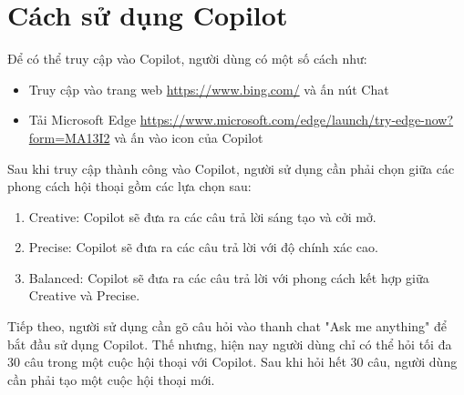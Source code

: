 \section{Cách sử dụng Copilot}
Để có thể truy cập vào Copilot\cite{link_5}, người dùng có một số cách như:
\begin{itemize}
    \item Truy cập vào trang web \url{https://www.bing.com/} và ấn nút Chat
    \item Tải Microsoft Edge \url{https://www.microsoft.com/edge/launch/try-edge-now?form=MA13I2} và ấn vào icon của Copilot
\end{itemize}
Sau khi truy cập thành công vào Copilot, người sử dụng cần phải chọn giữa các phong cách hội thoại gồm các lựa chọn sau:
\begin{enumerate}
    \item Creative: Copilot sẽ đưa ra các câu trả lời sáng tạo và cởi mở.
    \item Precise: Copilot sẽ đưa ra các câu trả lời với độ chính xác cao.
    \item Balanced: Copilot sẽ đưa ra các câu trả lời với phong cách kết hợp giữa Creative và Precise.
\end{enumerate}
Tiếp theo, người sử dụng cần gõ câu hỏi vào thanh chat "Ask me anything" để bắt đầu sử dụng Copilot. Thế nhưng, hiện nay người dùng chỉ có thể hỏi tối đa 30 câu trong một 
cuộc hội thoại với Copilot. Sau khi hỏi hết 30 câu, người dùng cần phải tạo một cuộc hội thoại mới.

